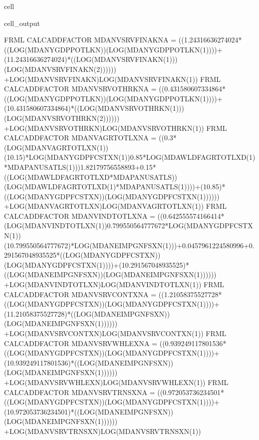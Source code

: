 \documentclass[letterpaper,10pt,english]{jupyterBook}
\begin{document}
\begin{sphinxuseclass}{cell}
\begin{sphinxVerbatimOutput}
\begin{sphinxuseclass}{cell_output}
\begin{sphinxVerbatim}[commandchars=\\\{\}]
FRML \PYGZlt{}CALC\PYGZus{}ADD\PYGZus{}FACTOR\PYGZgt{} MDANVSRVFINAKN\PYGZus{}A = \PYGZhy{} ((1.24316636274024*((LOG(MDANYGDPPOTLKN))\PYGZhy{}(LOG(MDANYGDPPOTLKN(\PYGZhy{}1))))+(1\PYGZhy{}1.24316636274024)*((LOG(MDANVSRVFINAKN(\PYGZhy{}1)))\PYGZhy{}(LOG(MDANVSRVFINAKN(\PYGZhy{}2)))))) +LOG(MDANVSRVFINAKN)\PYGZhy{}LOG(MDANVSRVFINAKN(\PYGZhy{}1))\PYGZdl{}
FRML \PYGZlt{}CALC\PYGZus{}ADD\PYGZus{}FACTOR\PYGZgt{} MDANVSRVOTHRKN\PYGZus{}A = \PYGZhy{} ((0.431580607334864*((LOG(MDANYGDPPOTLKN))\PYGZhy{}(LOG(MDANYGDPPOTLKN(\PYGZhy{}1))))+(1\PYGZhy{}0.431580607334864)*((LOG(MDANVSRVOTHRKN(\PYGZhy{}1)))\PYGZhy{}(LOG(MDANVSRVOTHRKN(\PYGZhy{}2)))))) +LOG(MDANVSRVOTHRKN)\PYGZhy{}LOG(MDANVSRVOTHRKN(\PYGZhy{}1))\PYGZdl{}
FRML \PYGZlt{}CALC\PYGZus{}ADD\PYGZus{}FACTOR\PYGZgt{} MDANVAGRTOTLXN\PYGZus{}A = \PYGZhy{} ((\PYGZhy{}0.3*(LOG(MDANVAGRTOTLXN(\PYGZhy{}1))\PYGZhy{}(1\PYGZhy{}0.15)*LOG(MDANYGDPFCSTXN(\PYGZhy{}1))\PYGZhy{}0.85*LOG(MDAWLDFAGRTOTLXD(\PYGZhy{}1)*MDAPANUSATLS(\PYGZhy{}1)))\PYGZhy{}1.82179756558893+0.15*((LOG(MDAWLDFAGRTOTLXD*MDAPANUSATLS))\PYGZhy{}(LOG(MDAWLDFAGRTOTLXD(\PYGZhy{}1)*MDAPANUSATLS(\PYGZhy{}1))))+(1\PYGZhy{}0.85)*((LOG(MDANYGDPFCSTXN))\PYGZhy{}(LOG(MDANYGDPFCSTXN(\PYGZhy{}1)))))) +LOG(MDANVAGRTOTLXN)\PYGZhy{}LOG(MDANVAGRTOTLXN(\PYGZhy{}1))\PYGZdl{}
FRML \PYGZlt{}CALC\PYGZus{}ADD\PYGZus{}FACTOR\PYGZgt{} MDANVINDTOTLXN\PYGZus{}A = \PYGZhy{} ((\PYGZhy{}0.642555574166414*(LOG(MDANVINDTOTLXN(\PYGZhy{}1))\PYGZhy{}0.799550564777672*LOG(MDANYGDPFCSTXN(\PYGZhy{}1))\PYGZhy{}(1\PYGZhy{}0.799550564777672)*LOG(MDANEIMPGNFSXN(\PYGZhy{}1)))+0.0457961224580996+0.291567048935525*((LOG(MDANYGDPFCSTXN))\PYGZhy{}(LOG(MDANYGDPFCSTXN(\PYGZhy{}1))))+(1\PYGZhy{}0.291567048935525)*((LOG(MDANEIMPGNFSXN))\PYGZhy{}(LOG(MDANEIMPGNFSXN(\PYGZhy{}1)))))) +LOG(MDANVINDTOTLXN)\PYGZhy{}LOG(MDANVINDTOTLXN(\PYGZhy{}1))\PYGZdl{}
FRML \PYGZlt{}CALC\PYGZus{}ADD\PYGZus{}FACTOR\PYGZgt{} MDANVSRVCONTXN\PYGZus{}A = \PYGZhy{} ((1.21058375527728*((LOG(MDANYGDPFCSTXN))\PYGZhy{}(LOG(MDANYGDPFCSTXN(\PYGZhy{}1))))+(1\PYGZhy{}1.21058375527728)*((LOG(MDANEIMPGNFSXN))\PYGZhy{}(LOG(MDANEIMPGNFSXN(\PYGZhy{}1)))))) +LOG(MDANVSRVCONTXN)\PYGZhy{}LOG(MDANVSRVCONTXN(\PYGZhy{}1))\PYGZdl{}
FRML \PYGZlt{}CALC\PYGZus{}ADD\PYGZus{}FACTOR\PYGZgt{} MDANVSRVWHLEXN\PYGZus{}A = \PYGZhy{} ((0.939249117801536*((LOG(MDANYGDPFCSTXN))\PYGZhy{}(LOG(MDANYGDPFCSTXN(\PYGZhy{}1))))+(1\PYGZhy{}0.939249117801536)*((LOG(MDANEIMPGNFSXN))\PYGZhy{}(LOG(MDANEIMPGNFSXN(\PYGZhy{}1)))))) +LOG(MDANVSRVWHLEXN)\PYGZhy{}LOG(MDANVSRVWHLEXN(\PYGZhy{}1))\PYGZdl{}
FRML \PYGZlt{}CALC\PYGZus{}ADD\PYGZus{}FACTOR\PYGZgt{} MDANVSRVTRNSXN\PYGZus{}A = \PYGZhy{} ((0.972053736234501*((LOG(MDANYGDPFCSTXN))\PYGZhy{}(LOG(MDANYGDPFCSTXN(\PYGZhy{}1))))+(1\PYGZhy{}0.972053736234501)*((LOG(MDANEIMPGNFSXN))\PYGZhy{}(LOG(MDANEIMPGNFSXN(\PYGZhy{}1)))))) +LOG(MDANVSRVTRNSXN)\PYGZhy{}LOG(MDANVSRVTRNSXN(\PYGZhy{}1))\PYGZdl{}

\end{sphinxVerbatim}
\end{sphinxuseclass}
\end{sphinxVerbatimOutput}
\end{sphinxuseclass}
\end{document}
